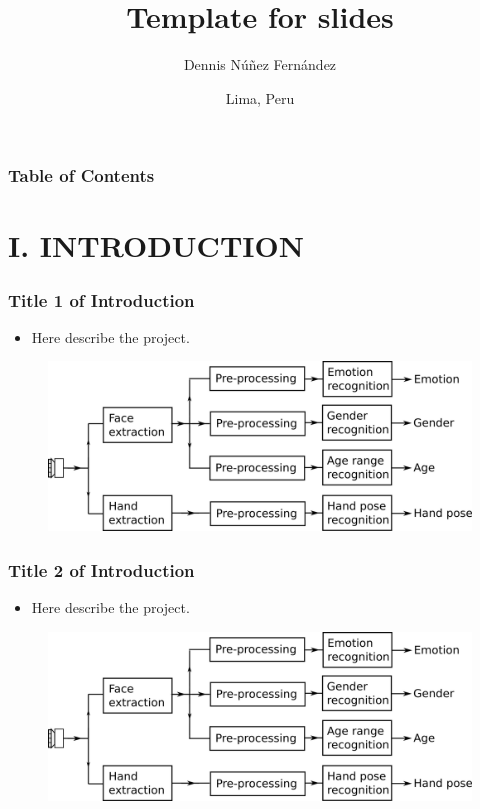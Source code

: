 \documentclass{beamer}
\title[Template for slides]{Template for slides}
\author[Dennis N\'u\~nez Fern\'andez]
{   %
    Dennis N\'u\~nez  Fern\'andez%
}
\institute[UNI]
{   %
    \begin{tabular}{c}
    Universidad Nacional de Ingenier\'ia
    \end{tabular}
}
\date[August-2018]
{   %
    Lima, Peru
}
\begin{document}
\frame{\titlepage}


\begin{frame}\frametitle{Table of Contents}
\tableofcontents
\end{frame}







\section{I. INTRODUCTION} 



\begin{frame}\frametitle{Title 1 of Introduction}

\begin{itemize}
\item Here describe the project.
\end{itemize}

\begin{figure}
\includegraphics[scale=0.4]{images/diagram.png}
\end{figure}

\end{frame}



\begin{frame}\frametitle{Title 2 of Introduction}

\begin{itemize}
\item Here describe the project.
\end{itemize}

\begin{figure}
\includegraphics[scale=0.4]{images/diagram.png}
\end{figure}

\end{frame}
\end{document}
